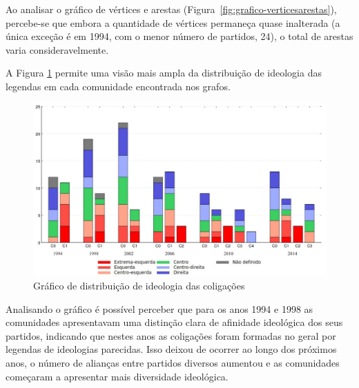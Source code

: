 Ao analisar o gráfico de vértices e arestas (Figura~\ref{fig:grafico-verticesarestas}), percebe-se que embora a quantidade de vértices permaneça quase inalterada (a única exceção é em 1994, com o menor número de partidos, 24), o total de arestas varia consideravelmente.

A Figura \ref{fig:grafico-comunidades} permite uma visão mais ampla da distribuição de ideologia das legendas em cada comunidade encontrada nos grafos.

\begin{figure}[h]
\includegraphics[width=1\textwidth]{4-resultados/graficos/grafico-geral.pdf}
\centering
\caption{
    Gráfico de distribuição de ideologia das coligações
}
\label{fig:grafico-comunidades}
\end{figure}


Analisando o gráfico é possível perceber que para os anos 1994 e 1998 as comunidades apresentavam uma distinção clara de afinidade ideológica dos seus partidos, indicando que nestes anos as coligações foram formadas no geral por legendas de ideologias parecidas. Isso deixou de ocorrer ao longo dos próximos anos, o número de alianças entre partidos diversos aumentou e as comunidades começaram a apresentar mais diversidade ideológica.
